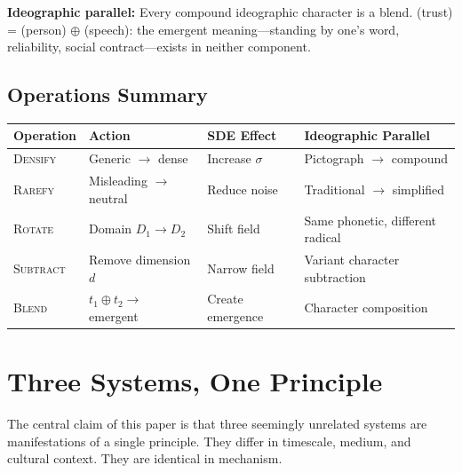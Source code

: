 \documentclass[12pt,a4paper]{article}
\begin{document}
\textbf{Ideographic parallel:}
Every compound ideographic character is a blend.
 (trust) =  (person) $\oplus$  (speech): the emergent meaning---standing by one's word, reliability, social contract---exists in neither component.

\subsection{Operations Summary}

\begin{center}
\begin{tabular}{llll}
\toprule
\textbf{Operation} & \textbf{Action} & \textbf{SDE Effect} & \textbf{Ideographic Parallel} \\
\midrule
\textsc{Densify}  & Generic $\rightarrow$ dense & Increase $\sigma$ & Pictograph $\rightarrow$ compound \\
\textsc{Rarefy}   & Misleading $\rightarrow$ neutral & Reduce noise & Traditional $\rightarrow$ simplified \\
\textsc{Rotate}   & Domain $D_1 \rightarrow D_2$ & Shift field & Same phonetic, different radical \\
\textsc{Subtract} & Remove dimension $d$ & Narrow field & Variant character subtraction \\
\textsc{Blend}    & $t_1 \oplus t_2 \rightarrow$ emergent & Create emergence & Character composition \\
\bottomrule
\end{tabular}
\end{center}


\section{Three Systems, One Principle}
\label{sec:isomorphism}

The central claim of this paper is that three seemingly unrelated systems are manifestations of a single principle.
They differ in timescale, medium, and cultural context.
They are identical in mechanism.
\end{document}
